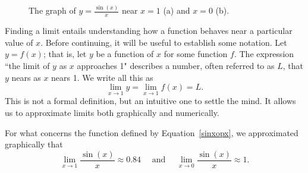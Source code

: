 \begin{figure}[H]
\centering
\qquad
{}
\caption{The graph of $y=\frac{\sin(x)}{x}$ near $x=1$ (a) and $x=0$ (b). }
\end{figure}



Finding a limit entails understanding how a function behaves near a particular value of $x$. Before continuing, it will be useful to establish some notation. Let $y=f(x)$; that is, let $y$ be a function of $x$ for some function $f$. The expression ``the limit of $y$ as $x$ approaches 1" describes a number, often referred to as $L$, that $y$ nears as $x$ nears 1. We write all this as 
$$\lim_{x\to 1} y = \lim_{x\to 1} f(x) = L.$$
 This is not a formal definition, but an intuitive one to settle the mind. It allows us to approximate limits both graphically and numerically.

For what concerns the function defined by Equation~\eqref{sinxopx}, we approximated graphically that 
$$\lim_{x\to 1} \frac{\sin (x)}{x} \approx 0.84 \quad \text{ and } \quad \lim_{x\to 0}\frac{\sin (x)}{x} \approx 1.
$$ 



